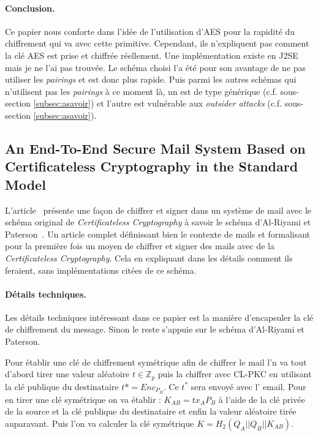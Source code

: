 \paragraph*{Conclusion.} Ce papier nous conforte dans l'idée de l'utilisation d'AES pour la rapidité du chiffrement qui va avec cette primitive. Cependant, ils n'expliquent pas comment la clé AES est prise et chiffrée réellement. Une implémentation existe en J2SE mais je ne l'ai pas trouvée. Le schéma choisi l'a été pour son avantage de ne pas utiliser les \textit{pairings} et est donc plus rapide. Puis parmi les autres schémas qui n'utilisent pas les \textit{pairings} à ce moment là, un est de type générique (c.f. sous-section \ref{subsec:asavoir}) et l'autre est vulnérable aux \textit{outsider attacks} (c.f. sous-section \ref{subsec:asavoir}).

\subsection{An End-To-End Secure Mail System Based on Certificateless Cryptography in the Standard Model}
L'article~\cite{endToEndSecureEmailArticle} présente une façon de chiffrer et signer dans un système de mail avec le schéma original de \textit{Certificateless Cryptography} à savoir le schéma d'Al-Riyami et Paterson~\cite{DBLP:conf/asiacrypt/Al-RiyamiP03}. Un article complet définissant bien le contexte de mails et formalisant pour la première fois un moyen de chiffrer et signer des mails avec de la \textit{Certificateless Cryptography}. Cela en expliquant dans les détails comment ils feraient, sans implémentations citées de ce schéma.
\paragraph*{Détails techniques.} Les détails techniques intéressant dans ce papier est la manière d'encapsuler la clé de chiffrement du message. Sinon le reste s'appuie sur le schéma d'Al-Riyami et Paterson.

Pour établir une clé de chiffrement symétrique afin de chiffrer le mail l'n va tout d'abord tirer une valeur aléatoire $t \in \mathbb{Z}_p$ puis la chiffrer avec CL-PKC en utilisant la clé publique du destinataire $t* = Enc_{P_B}$. Ce $t^*$ sera envoyé avec l' email. Pour en tirer une clé symétrique on va établir : $K_{AB} = tx_AP_B$ à l'aide de la clé privée de la source et la clé publique du destinataire et enfin la valeur aléatoire tirée auparavant. Puis l'on va calculer la clé symétrique $K = H_2(Q_A||Q_B||K_{AB})$.

